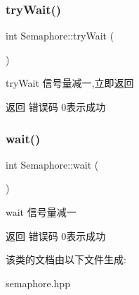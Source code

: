 \subsubsection{\texorpdfstring{try\+Wait()}{tryWait()}}
{\footnotesize\ttfamily int Semaphore\+::try\+Wait (\begin{DoxyParamCaption}{ }\end{DoxyParamCaption})\hspace{0.3cm}{\ttfamily [inline]}}



try\+Wait 信号量减一,立即返回 

\begin{DoxyReturn}{返回}
错误码 0表示成功 
\end{DoxyReturn}
\mbox{\label{classSemaphore_ab50da3ab3fdc7f56acc85cbdf248c98d}} 
\subsubsection{\texorpdfstring{wait()}{wait()}}
{\footnotesize\ttfamily int Semaphore\+::wait (\begin{DoxyParamCaption}{ }\end{DoxyParamCaption})\hspace{0.3cm}{\ttfamily [inline]}}



wait 信号量减一 

\begin{DoxyReturn}{返回}
错误码 0表示成功 
\end{DoxyReturn}


该类的文档由以下文件生成\+:\begin{DoxyCompactItemize}
\item 
semaphore.\+hpp\end{DoxyCompactItemize}
